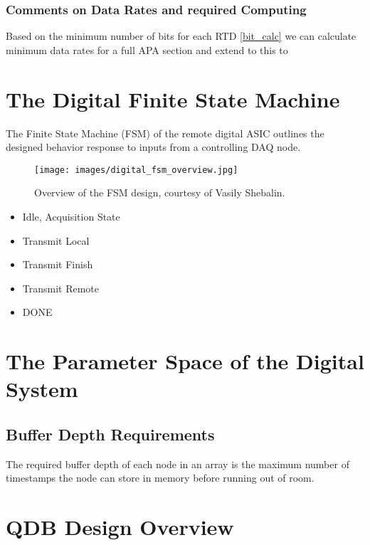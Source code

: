 \subsubsection{Comments on Data Rates and required Computing}

Based on the minimum number of bits for each RTD \ref{bit_calc} we can calculate minimum data rates for a full APA section and extend to this to 


\section{The Digital Finite State Machine}

The Finite State Machine (FSM) of the remote digital ASIC outlines the designed behavior response to inputs from a controlling DAQ node.

\begin{figure}[]
\centering
\texttt{[image: images/digital\_fsm\_overview.jpg]}
\caption{Overview of the FSM design, courtesy of Vasily Shebalin.}
\end{figure}

\begin{itemize}
    \item Idle, Acquisition State
    \item Transmit Local
    \item Transmit Finish
    \item Transmit Remote
    \item DONE
\end{itemize}
\label{fsm_state_labels}

\section{The Parameter Space of the Digital System}


\subsection{Buffer Depth Requirements}

The required buffer depth of each node in an array is the maximum number of timestamps the node can store in memory before running out of room.

\section{QDB Design Overview}


